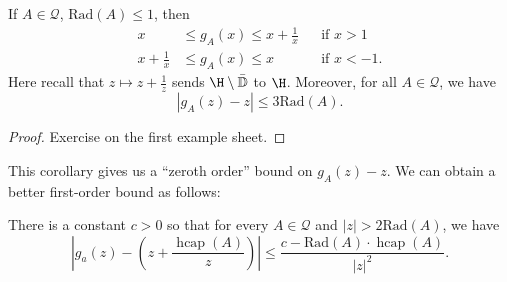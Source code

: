 \documentclass[a4paper]{article}
\renewcommand\D{\mathbb{D}}
\DeclareMathOperator\hcap{hcap}
\newcommand\rad{\mathrm{Rad}}
\begin{document}
\begin{cor}
  If $A \in \mathcal{Q}$, $\rad(A) \leq 1$, then
  \begin{align*}
    x &\leq g_A(x) \leq x + \frac{1}{x}&&\text{if }x > 1\\
    x + \frac{1}{x} &\leq g_A(x) \leq x && \text{if }x < -1.
  \end{align*}
  Here recall that $z \mapsto z + \frac{1}{z}$ sends $\H \setminus \bar{\D}$ to $\H$. Moreover, for all $A \in \mathcal{Q}$, we have
  \[
    |g_A(z) - z| \leq 3 \rad(A).
  \]
\end{cor}

\begin{proof}
  Exercise on the first example sheet.
\end{proof}
This corollary gives us a ``zeroth order'' bound on $g_A(z) - z$. We can obtain a better first-order bound as follows:
\begin{prop}
  There is a constant $c > 0$ so that for every $A \in \mathcal{Q}$ and $|z| > 2 \rad(A)$, we have
  \[
    \left|g_a(z) - \left(z + \frac{\hcap(A)}{z}\right)\right| \leq \frac{c - \rad(A) \cdot \hcap(A)}{|z|^2}.
  \]
\end{prop}
\end{document}
